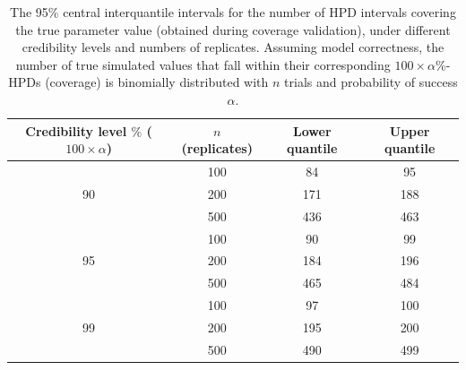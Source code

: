 \documentclass[oneside]{article}
\begin{document}
\begin{table}
\begin{center}
\begin{tabular}{cccc}
\hline
Credibility level $\%$ ($100 \times \alpha$) & $n$ (replicates) & Lower quantile & Upper quantile \\ \hline
  \rowcolor{gray!10}   & 100            & 84    & 95    \\
  \rowcolor{gray!10}90 & 200            & 171   & 188   \\
  \rowcolor{gray!10}   & 500            & 436   & 463   \\
                       & 100            & 90    & 99    \\
                  95   & 200            & 184   & 196   \\
                       & 500            & 465   & 484   \\
  \rowcolor{gray!10}   & 100            & 97    & 100   \\
  \rowcolor{gray!10}99 & 200            & 195   & 200   \\
  \rowcolor{gray!10}   & 500            & 490   & 499   \\ \hline%
\end{tabular}
\end{center}
\caption{%
  The 95\% central interquantile intervals for the number of HPD intervals covering the true parameter value (obtained during coverage validation), under different credibility levels and numbers of replicates.
  Assuming model correctness, the number of true simulated values that fall within their corresponding $100 \times \alpha$\%-HPDs (coverage) is binomially distributed with $n$ trials and probability of success $\alpha$.
  }
\label{tab:coverage2}
\end{table}
\end{document}
